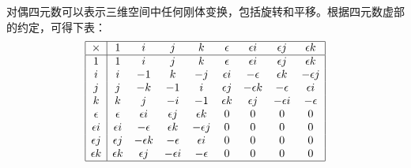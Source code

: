 \begin{note}
    对偶四元数可以表示三维空间中任何刚体变换，包括旋转和平移。根据四元数虚部的约定，可得下表：
    \[
        \begin{array}{|c|cccccccc|}
            \hline
            \times & 1 & i & j & k & \epsilon & \epsilon i & \epsilon j & \epsilon k \\
            \hline
            1 & 1 & i & j & k & \epsilon & \epsilon i & \epsilon j & \epsilon k \\
            i & i & -1 & k & -j & \epsilon i & -\epsilon & \epsilon k & -\epsilon j \\
            j & j & -k & -1 & i & \epsilon j & -\epsilon k & -\epsilon & \epsilon i \\
            k & k & j & -i & -1 & \epsilon k & \epsilon j & -\epsilon i & -\epsilon \\
            \epsilon  & \epsilon & \epsilon i & \epsilon j & \epsilon k & 0 & 0 & 0 & 0 \\
            \epsilon i & \epsilon i & -\epsilon & \epsilon k & -\epsilon j & 0 & 0 & 0 & 0 \\
            \epsilon j & \epsilon j & -\epsilon k & -\epsilon & \epsilon i & 0 & 0 & 0 & 0 \\
            \epsilon k & \epsilon k & \epsilon j & -\epsilon i & -\epsilon & 0 & 0 & 0 & 0 \\
            \hline
        \end{array}
    \]

\end{note}